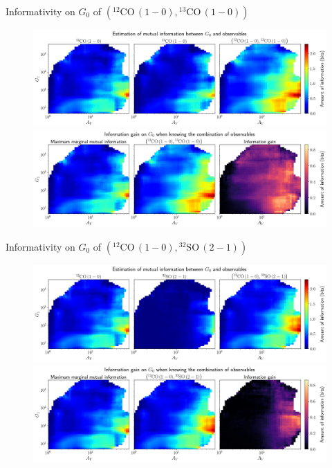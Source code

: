 \documentclass{beamer}
\begin{document}
\begin{frame}{Informativity on $G_0$ of $\left(\mathrm{^{12}CO\,(1-0)},\mathrm{^{13}CO\,(1-0)}\right)$}
    \begin{figure}
        \centering
        \includegraphics[width=0.95\linewidth]{../mi/g0__12co10_13co10_mi.png}
        \vfill
        \includegraphics[width=0.95\linewidth]{../mi/g0__12co10_13co10_mi_gain.png}
    \end{figure}
\end{frame}

\begin{frame}{Informativity on $G_0$ of $\left(\mathrm{^{12}CO\,(1-0)},\mathrm{^{32}SO\,(2-1)}\right)$}
    \begin{figure}
        \centering
        \includegraphics[width=0.95\linewidth]{../mi/g0__12co10_32so21_mi.png}
        \vfill
        \includegraphics[width=0.95\linewidth]{../mi/g0__12co10_32so21_mi_gain.png}
    \end{figure}
\end{frame}
\end{document}
